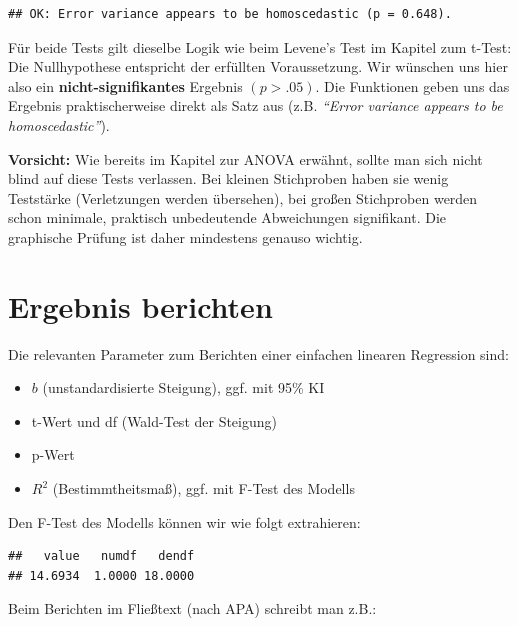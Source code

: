 \documentclass[
]{book}
\newenvironment{Shaded}{\begin{snugshade}}{\end{snugshade}}
\newcommand{\FunctionTok}[1]{\textcolor[rgb]{0.13,0.29,0.53}{\textbf{#1}}}
\newcommand{\NormalTok}[1]{#1}
\newcommand{\SpecialCharTok}[1]{\textcolor[rgb]{0.81,0.36,0.00}{\textbf{#1}}}
\providecommand{\tightlist}{%
  \setlength{\itemsep}{0pt}\setlength{\parskip}{0pt}}
\begin{document}
\begin{verbatim}
## OK: Error variance appears to be homoscedastic (p = 0.648).
\end{verbatim}

Für beide Tests gilt dieselbe Logik wie beim Levene's Test im Kapitel zum t-Test: Die Nullhypothese entspricht der erfüllten Voraussetzung. Wir wünschen uns hier also ein \textbf{nicht-signifikantes} Ergebnis \((p > .05)\). Die Funktionen geben uns das Ergebnis praktischerweise direkt als Satz aus (z.B. \emph{``Error variance appears to be homoscedastic''}).

\textbf{Vorsicht:} Wie bereits im Kapitel zur ANOVA erwähnt, sollte man sich nicht blind auf diese Tests verlassen. Bei kleinen Stichproben haben sie wenig Teststärke (Verletzungen werden übersehen), bei großen Stichproben werden schon minimale, praktisch unbedeutende Abweichungen signifikant. Die graphische Prüfung ist daher mindestens genauso wichtig.

\section{Ergebnis berichten}\label{ergebnis-berichten-1}

Die relevanten Parameter zum Berichten einer einfachen linearen Regression sind:

\begin{itemize}
\tightlist
\item
  \(b\) (unstandardisierte Steigung), ggf. mit 95\% KI
\item
  t-Wert und df (Wald-Test der Steigung)
\item
  p-Wert
\item
  \(R^2\) (Bestimmtheitsmaß), ggf. mit F-Test des Modells
\end{itemize}

Den F-Test des Modells können wir wie folgt extrahieren:

\begin{Shaded}
\end{Shaded}

\begin{verbatim}
##   value   numdf   dendf 
## 14.6934  1.0000 18.0000
\end{verbatim}

Beim Berichten im Fließtext (nach APA) schreibt man z.B.:
\end{document}
